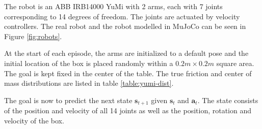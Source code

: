 \documentclass{kththesis}
\newcommand{\vs}{\pmb{s}_t}
\newcommand{\va}{\pmb{a}_t}
\newcommand{\vns}{\pmb{s}_{t+1}}
\begin{document}
The robot is an ABB IRB14000 YuMi with 2 arms, each with 7 joints corresponding to 14 degrees of freedom. The joints are actuated by velocity controllers. The real robot and the robot modelled in MuJoCo can be seen in Figure \ref{fig:robots}. 

At the start of each episode, the arms are initialized to a default pose and the initial location of the box is placed randomly within a $0.2m \times 0.2m$ square area. The goal is kept fixed in the center of the table. The true friction and center of mass distributions are listed in table \ref{table:yumi-dist}.

The goal is now to predict the next state $\vns$ given $\vs$ and $\va$. The state consists of the position and velocity of all 14 joints as well as the position, rotation and velocity of the box.

\end{document}
